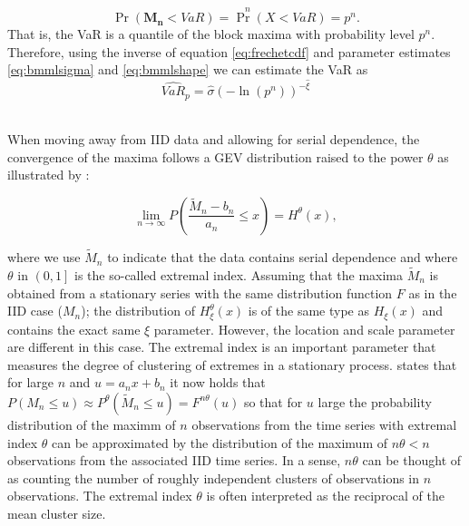 \documentclass[a4paper,12pt]{article}
\theoremstyle{plain}
\begin{document}
\begin{equation}
    \Pr\left(\bm{M_n}<VaR\right)=\Pr^{\quad n}\left(X<VaR\right)=p^n.
    \label{eq:relationrlvar}
\end{equation}
That is, the VaR is a quantile of the block maxima with probability level $p^n$. Therefore, using the inverse of equation \eqref{eq:frechetcdf} and parameter estimates \eqref{eq:bmmlsigma} and \eqref{eq:bmmlshape} we can estimate the VaR as
\begin{equation}
    \widehat{VaR}_p = \hat{\sigma}\left(-\ln{\left(p^n\right)}\right)^{-\hat{\xi}}
    \label{eq:bmestvariid}
\end{equation}

\\

When moving away from IID data and allowing for serial dependence, the convergence of the maxima follows a GEV distribution raised to the power $\theta$ as illustrated by :

\begin{equation}
    \lim_{n\to\infty} P\left(\frac{\tilde{M}_n-b_n}{a_n}\leq x\right)=H^{\theta}\left(x\right),
\end{equation}

\noindent where we use $\tilde{M}_n$ to indicate that the data contains serial dependence and where $\theta$ in $\left(0, 1\right]$ is the so-called extremal index. Assuming that the maxima $\tilde{M}_n$ is obtained from a stationary series with the same distribution function $F$ as in the IID case ($M_n$); the distribution of $H_{\xi}^{\theta}\left(x\right)$ is of the same type as $H_{\xi}\left(x\right)$ and contains the exact same $\xi$ parameter. However, the location and scale parameter are different in this case. The extremal index is an important parameter that measures the degree of clustering of extremes in a stationary process.  states that for large $n$ and $u=a_nx+b_n$ it now holds that $P\left(M_n\leq u\right)\approx P^{\theta}\left(\tilde{M}_n\leq u\right)=F^{n\theta}\left(u\right)$ so that for $u$ large the probability distribution of the maximm of $n$ observations from the time series with extremal index $\theta$ can be approximated by the distribution of the maximum of $n\theta<n$ observations from the associated IID time series. In a sense, $n\theta$ can be thought of as counting the number of roughly independent clusters of observations in $n$ observations. The extremal index $\theta$ is often interpreted as the reciprocal of the mean cluster size.
\\
\end{document}
